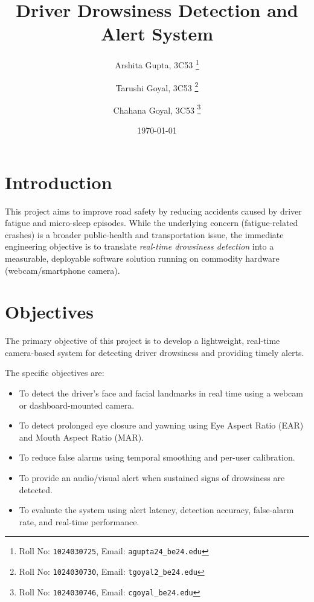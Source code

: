 \documentclass[11pt,a4paper]{article}
\title{Driver Drowsiness Detection and Alert System}
\author{
   Arshita Gupta, 3C53
  \thanks{Roll No: \texttt{1024030725}, 
    Email: \texttt{agupta24\_be24\@thapar.edu}}
  \and
   Tarushi Goyal, 3C53%
  \thanks{Roll No: \texttt{1024030730}, %
    Email: \texttt{tgoyal2\_be24\@thapar.edu}}
     \and
   Chahana Goyal, 3C53%
  \thanks{Roll No: \texttt{1024030746}, %
    Email: \texttt{cgoyal\_be24\@thapar.edu}}
}
\date{\today}
\begin{document}
\maketitle

\section{Introduction}
This project aims to improve road safety by reducing
accidents caused by driver fatigue and micro-sleep
episodes. While the underlying concern (fatigue-related
crashes) is a broader public-health and transportation
issue, the immediate engineering objective is to
translate \emph{real-time drowsiness detection} into a
measurable, deployable software solution running on
commodity hardware (webcam/smartphone camera).

\section{Objectives}

The primary objective of this project is to develop a lightweight,
real-time camera-based system for detecting driver drowsiness and
providing timely alerts.

The specific objectives are:
\begin{itemize}[leftmargin=0.7cm]
    \item To detect the driver's face and facial landmarks in real time
    using a webcam or dashboard-mounted camera.
    
    \item To detect prolonged eye closure and yawning using Eye Aspect
    Ratio (EAR) and Mouth Aspect Ratio (MAR).
    
    \item To reduce false alarms using temporal smoothing and
    per-user calibration.
    
    \item To provide an audio/visual alert when sustained signs of
    drowsiness are detected.
    
    \item To evaluate the system using alert latency, detection
    accuracy, false-alarm rate, and real-time performance.
\end{itemize}
\end{document}
